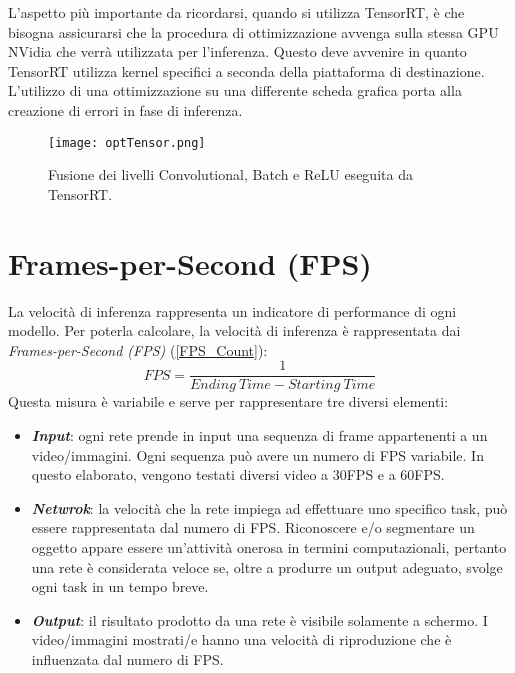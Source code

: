 L'aspetto più importante da ricordarsi, quando si utilizza TensorRT, è che 
bisogna assicurarsi che la procedura di ottimizzazione avvenga sulla stessa 
GPU NVidia che verrà utilizzata per l'inferenza. Questo deve avvenire 
in quanto TensorRT utilizza kernel specifici a seconda della piattaforma 
di destinazione. L'utilizzo di una ottimizzazione su una differente scheda 
grafica porta alla creazione di errori in fase di inferenza. 
\begin{figure}
    \centering
    \texttt{[image: optTensor.png]}
    \centering
    \caption{Fusione dei livelli Convolutional, Batch e ReLU eseguita da TensorRT.}
    \label{fusion_tensorrt}
\end{figure}



\section{Frames-per-Second (FPS)}
La velocità di inferenza rappresenta un indicatore di performance di ogni 
modello. Per poterla calcolare, la velocità di inferenza è rappresentata dai 
\emph{Frames-per-Second (FPS)} (\ref{FPS_Count}):
\begin{equation}\label{FPS_Count}
    FPS = \frac{1}{Ending \ Time - Starting \ Time}
\end{equation}
Questa misura è variabile e serve per rappresentare tre diversi elementi:
\begin{itemize}
    \item {\bfseries{\emph{Input}}}: ogni rete prende in input una sequenza di frame appartenenti 
    a un video/immagini. Ogni sequenza può avere un numero di FPS variabile. In 
    questo elaborato, vengono testati diversi video a 30FPS e a 60FPS.
    \item {\bfseries{\emph{Netwrok}}}: la velocità che la rete impiega ad effettuare uno specifico 
    task, può essere rappresentata dal numero di FPS. Riconoscere e/o 
    segmentare un oggetto appare essere un'attività onerosa in termini 
    computazionali, pertanto una rete è considerata veloce se, oltre a 
    produrre un output adeguato, svolge ogni task in un tempo breve.
    \item {\bfseries{\emph{Output}}}: il risultato prodotto da una rete è visibile solamente a 
    schermo. I video/immagini mostrati/e hanno una velocità di riproduzione 
    che è influenzata dal numero di FPS.
\end{itemize}